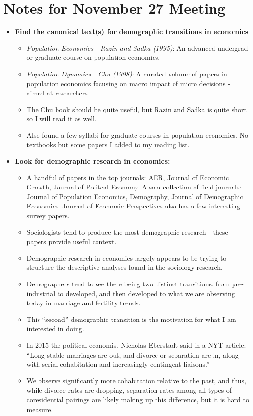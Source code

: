 \documentclass{article}
\begin{document}
{}

\section*{Notes for November 27 Meeting}

\begin{itemize}
\item \textbf{Find the canonical text(s) for demographic transitions in economics}
\begin{itemize}



\item \textit{Population Economics - Razin and Sadka (1995)}: An advanced undergrad or graduate course on population economics.
\item \textit{Population Dynamics - Chu (1998)}: A curated volume of papers in population economics focusing on macro impact of micro decisions - aimed at researchers.

\item The Chu book should be quite useful, but Razin and Sadka is quite short so I will read it as well.

\item Also found a few syllabi for graduate courses in population economics. No textbooks but some papers I added to my reading list.

\end{itemize}

\item \textbf{Look for demographic research in economics:}
\begin{itemize}
\item A handful of papers in the top journals: AER, Journal of Economic Growth, Journal of Politcal Economy. Also a collection of field journals: Journal of Population Economics, Demography, Journal of Demographic Economics. Journal of Economic Perspectives also has a few interesting survey papers.
\item Sociologists tend to produce the most demographic research - these papers provide useful context. 
\item Demographic research in economics largely appears to be trying to structure the descriptive analyses found in the sociology research.
\item Demographers tend to see there being two distinct transitions: from pre-industrial to developed, and then developed to what we are observing today in marriage and fertility trends.
\item This ``second'' demographic transition is the motivation for what I am interested in doing.
\item In 2015 the political economist Nicholas Eberstadt said in a NYT article: ``Long stable marriages are out, and divorce or separation are in, along with serial cohabitation and increasingly contingent liaisons.''
\item We observe significantly more cohabitation relative to the past, and thus, while divorce rates are dropping, separation rates among all types of coresidential pairings are likely making up this difference, but it is hard to measure. 
\end{itemize}



\end{itemize}
\end{document}
